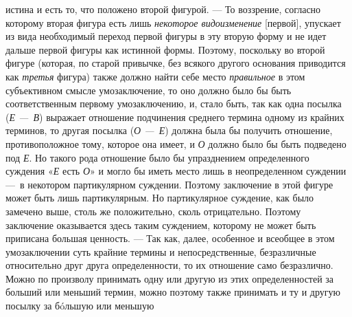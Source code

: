 \documentclass[twoside]{article}
\begin{document}
{{{{{истина и есть то, что положено второй фигурой. — То
воззрение, согласно которому вторая фигура есть лишь
{\em некоторое видоизменение}
[первой], упускает из вида необходимый переход первой фигуры
в эту вторую форму и не идет дальше первой фигуры как
истинной формы. Поэтому, поскольку во второй фигуре (которая, по старой
привычке, без всякого другого основания приводится как
{\em третья} фигура)
также должно найти себе место
{\em правильное} в этом
субъективном смысле умозаключение, то оно должно было бы быть
соответственным первому умозаключению, и, стало быть, так как одна посылка
({\em Е —~В})
выражает отношение подчинения среднего термина одному из
крайних терминов, то другая посылка
({\em О —~Е})
должна была бы получить отношение, противоположное тому,
которое она имеет, и {\em О}
должно было бы быть подведено под
{\em Е}. Но такого рода
отношение было бы упразднением определенного суждения
«{\em Е} есть
{\em О}» и могло бы иметь
место лишь в неопределенном суждении —~в некотором
партикулярном суждении. Поэтому заключение в этой фигуре может быть лишь
партикулярным. Но партикулярное суждение, как было замечено выше, столь же
положительно, сколь отрицательно. Поэтому заключение оказывается здесь
таким суждением, которому не может быть приписана большая ценность. —
Так как, далее, особенное и всеобщее в этом умозаключении
суть крайние термины и непосредственные, безразличные относительно друг
друга определенности, то их отношение само безразлично. Можно по произволу
принимать одну или другую из этих определенностей за больший или меньший
термин, можно поэтому также принимать и ту и другую посылку за бóльшую или
меньшую~}}}}}
\end{document}
